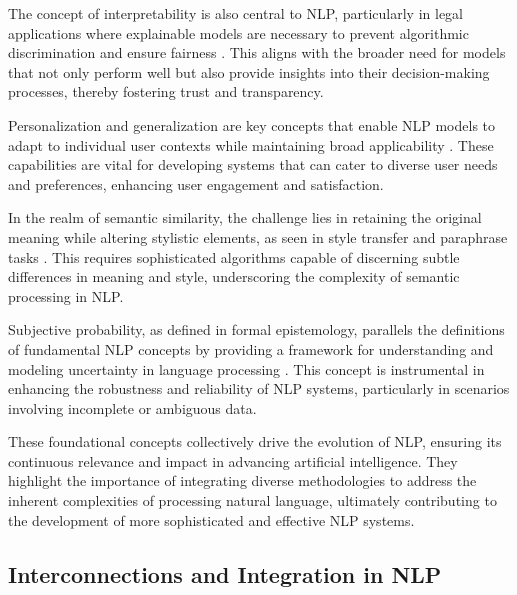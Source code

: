 The concept of interpretability is also central to NLP, particularly in legal applications where explainable models are necessary to prevent algorithmic discrimination and ensure fairness \cite{lin2023interpretabilityframeworksimilarcase}. This aligns with the broader need for models that not only perform well but also provide insights into their decision-making processes, thereby fostering trust and transparency.



Personalization and generalization are key concepts that enable NLP models to adapt to individual user contexts while maintaining broad applicability \cite{kaur2024cropcontextwiserobuststatic}. These capabilities are vital for developing systems that can cater to diverse user needs and preferences, enhancing user engagement and satisfaction.



In the realm of semantic similarity, the challenge lies in retaining the original meaning while altering stylistic elements, as seen in style transfer and paraphrase tasks \cite{yamshchikov2020styletransferparaphraselookingsensible}. This requires sophisticated algorithms capable of discerning subtle differences in meaning and style, underscoring the complexity of semantic processing in NLP.



Subjective probability, as defined in formal epistemology, parallels the definitions of fundamental NLP concepts by providing a framework for understanding and modeling uncertainty in language processing \cite{cieslinski2022axiomstypefreesubjectiveprobability}. This concept is instrumental in enhancing the robustness and reliability of NLP systems, particularly in scenarios involving incomplete or ambiguous data.



These foundational concepts collectively drive the evolution of NLP, ensuring its continuous relevance and impact in advancing artificial intelligence. They highlight the importance of integrating diverse methodologies to address the inherent complexities of processing natural language, ultimately contributing to the development of more sophisticated and effective NLP systems.



\subsection{Interconnections and Integration in NLP} \label{subsec:Interconnections and Integration in NLP}

